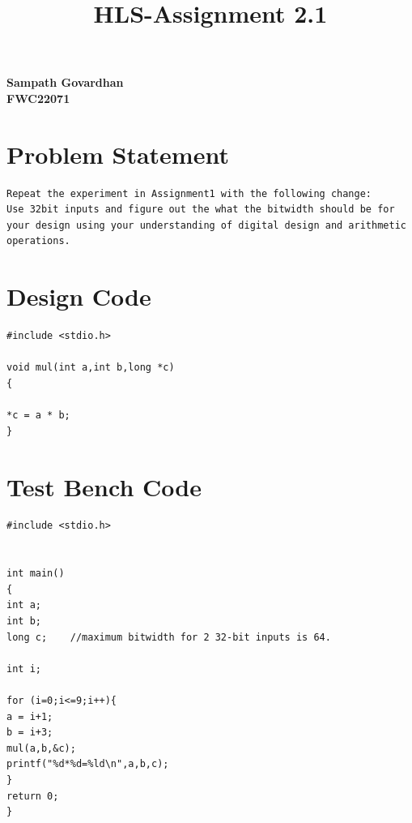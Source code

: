 \documentclass{article}
\title{
HLS-Assignment 2.1
}
\begin{document}
\maketitle
\hfill \textbf{Sampath Govardhan} \\
\null \hfill \textbf{FWC22071}\\
\tableofcontents
\section{Problem Statement}
\begin{lstlisting}
Repeat the experiment in Assignment1 with the following change:
Use 32bit inputs and figure out the what the bitwidth should be for your design using your understanding of digital design and arithmetic operations.
\end{lstlisting}
\vspace{10cm}


\section{Design Code}
\begin{lstlisting}
#include <stdio.h>

void mul(int a,int b,long *c)
{

*c = a * b;
}

\end{lstlisting}
\vspace{5cm}


\section{Test Bench Code}
\begin{lstlisting}
#include <stdio.h>


int main()
{
int a;
int b;
long c;    //maximum bitwidth for 2 32-bit inputs is 64.

int i;

for (i=0;i<=9;i++){
a = i+1;
b = i+3;
mul(a,b,&c);
printf("%d*%d=%ld\n",a,b,c);
}
return 0;
}


\end{lstlisting}
\vspace{5cm}
\end{document}
